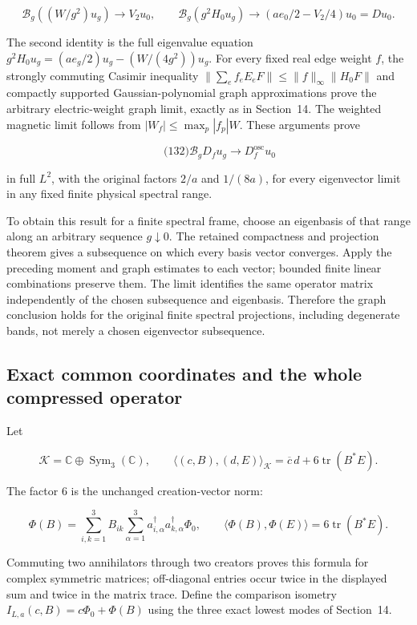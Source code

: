 \[
\mathcal B_g((W/g^2)u_g)\to V_2u_0,\qquad
 \mathcal B_g(g^2H_0u_g)\to
          (ae_0/2-V_2/4)u_0=Du_0 .
\]

The second identity is the full eigenvalue equation
\(g^2H_0u_g=(ae_g/2)u_g-(W/(4g^2))u_g\). For every fixed real edge
weight \(f\), the strongly commuting Casimir inequality
\(\|\sum_ef_eE_eF\|\le\|f\|_\infty\|H_0F\|\) and compactly supported
Gaussian-polynomial graph approximations prove the arbitrary
electric-weight graph limit, exactly as in Section~14. The weighted
magnetic limit follows from \(|W_f|\le\max_p|f_p|W\). These arguments
prove

\[
\qquad\text{(132)}
 \mathcal B_gD_fu_g\longrightarrow D_f^{\mathrm{osc}}u_0
\]

in full \(L^2\), with the original factors \(2/a\) and \(1/(8a)\), for
every eigenvector limit in any fixed finite physical spectral range.

To obtain this result for a finite spectral frame, choose an eigenbasis
of that range along an arbitrary sequence \(g\downarrow0\). The retained
compactness and projection theorem gives a subsequence on which every
basis vector converges. Apply the preceding moment and graph estimates
to each vector; bounded finite linear combinations preserve them. The
limit identifies the same operator matrix independently of the chosen
subsequence and eigenbasis. Therefore the graph conclusion holds for the
original finite spectral projections, including degenerate bands, not
merely a chosen eigenvector subsequence.

\subsection{Exact common coordinates and the whole compressed
operator}\label{local-energy-band-transfer-md-exact-common-coordinates-and-the-whole-compressed-operator}

Let

\[
\mathcal K=\mathbb C\oplus\operatorname{Sym}_3(\mathbb C),\qquad
 \langle(c,B),(d,E)\rangle_{\mathcal K}
 =\overline c\,d+6\operatorname{tr}(B^*E).
\]

The factor \(6\) is the unchanged creation-vector norm:

\[
\Phi(B)=\sum_{i,k=1}^3B_{ik}
            \sum_{\alpha=1}^3a_{i,\alpha}^\dagger
                            a_{k,\alpha}^\dagger\Phi_0,
 \qquad \langle\Phi(B),\Phi(E)\rangle=6\operatorname{tr}(B^*E).
\]

Commuting two annihilators through two creators proves this formula for
complex symmetric matrices; off-diagonal entries occur twice in the
displayed sum and twice in the matrix trace. Define the comparison
isometry \(I_{L,a}(c,B)=c\Phi_0+\Phi(B)\) using the three exact lowest
modes of Section~14.

